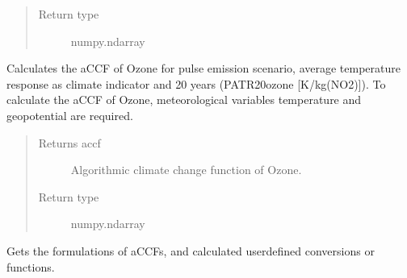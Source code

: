 \documentclass[a4paper,11pt,english]{sphinxmanual}
\begin{document}
\begin{fulllineitems}
\begin{fulllineitems}
\begin{quote}
\begin{description}
\item[{Return type}] \leavevmode
\sphinxAtStartPar
numpy.ndarray

\end{description}\end{quote}

\end{fulllineitems}


\begin{fulllineitems}
\label{\detokenize{envlib:envlib.accf.CalAccf.accf_o3}}
\sphinxAtStartPar
Calculates the aCCF of Ozone for pulse emission scenario, average temperature response as climate
indicator and 20 years (P\sphinxhyphen{}ATR20\sphinxhyphen{}ozone {[}K/kg(NO2){]}). To calculate the aCCF of Ozone, meteorological variables
temperature and geopotential are required.
\begin{quote}\begin{description}
\item[{Returns accf}] \leavevmode
\sphinxAtStartPar
Algorithmic climate change function of Ozone.

\item[{Return type}] \leavevmode
\sphinxAtStartPar
numpy.ndarray

\end{description}\end{quote}

\end{fulllineitems}


\begin{fulllineitems}
\label{\detokenize{envlib:envlib.accf.CalAccf.get_accfs}}
\sphinxAtStartPar
Gets the formulations of aCCFs, and calculated user\sphinxhyphen{}defined conversions or functions.

\end{fulllineitems}



\end{fulllineitems}
\end{document}
